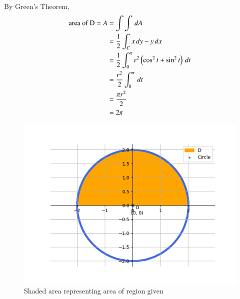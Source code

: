 \documentclass[journal]{IEEEtran}
\begin{document}
By Green's Theorem,
\begin{align}
	\text{area of D}  = A &= \int \int \, dA\\
	&= \frac{1}{2} \int_{C} x\, dy - y\, dx\\
	&= \frac{1}{2} \int_{0}^{\pi} r^2\left(\cos^2{t} + \sin^2{t}\right) \, dt\\
	&= \frac{r^2}{2} \int_{0}^{\pi} \, dt\\
	&= \frac{\pi r^2}{2}\\
	&= 2\pi
\end{align}

\begin{figure}[h!]
   \centering
   \includegraphics[width=0.7\linewidth]{figs/graph.png}
   \caption{Shaded area representing area of region given}
\end{figure}
\end{document}
